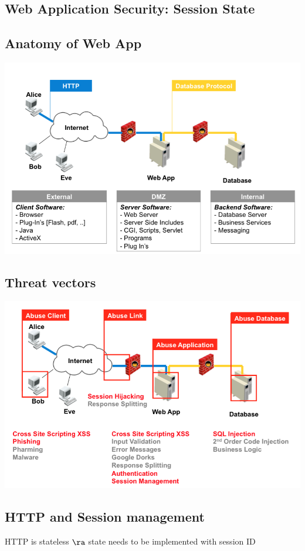 \documentclass[fs, footer]{latex4ei}
\begin{document}
\begin{multicols*}{4}
\section{Web Application Security: Session State}

\subsection{Anatomy of Web App}
\includegraphics[width=\columnwidth]{img/webapp.png}

\subsection{Threat vectors}
\includegraphics[width=\columnwidth]{img/threatvectors.png}


\subsection{HTTP  and Session management}
HTTP is stateless $\ra$ state needs to be implemented with session ID


\end{multicols*}
\end{document}

